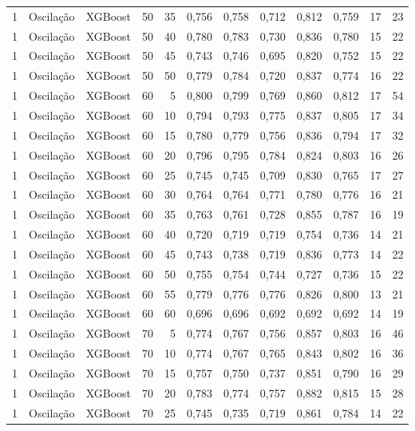\begin{longtable}{@{}rllrrrrrrrrr@{}}
1 & Oscilação & XGBoost & 50 & 35 & 0,756 & 0,758 & 0,712 & 0,812 & 0,759 & 17 & 23 \\
1 & Oscilação & XGBoost & 50 & 40 & 0,780 & 0,783 & 0,730 & 0,836 & 0,780 & 15 & 22 \\
1 & Oscilação & XGBoost & 50 & 45 & 0,743 & 0,746 & 0,695 & 0,820 & 0,752 & 15 & 22 \\
1 & Oscilação & XGBoost & 50 & 50 & 0,779 & 0,784 & 0,720 & 0,837 & 0,774 & 16 & 22 \\
1 & Oscilação & XGBoost & 60 & 5 & 0,800 & 0,799 & 0,769 & 0,860 & 0,812 & 17 & 54 \\
1 & Oscilação & XGBoost & 60 & 10 & 0,794 & 0,793 & 0,775 & 0,837 & 0,805 & 17 & 34 \\
1 & Oscilação & XGBoost & 60 & 15 & 0,780 & 0,779 & 0,756 & 0,836 & 0,794 & 17 & 32 \\
1 & Oscilação & XGBoost & 60 & 20 & 0,796 & 0,795 & 0,784 & 0,824 & 0,803 & 16 & 26 \\
1 & Oscilação & XGBoost & 60 & 25 & 0,745 & 0,745 & 0,709 & 0,830 & 0,765 & 17 & 27 \\
1 & Oscilação & XGBoost & 60 & 30 & 0,764 & 0,764 & 0,771 & 0,780 & 0,776 & 16 & 21 \\
1 & Oscilação & XGBoost & 60 & 35 & 0,763 & 0,761 & 0,728 & 0,855 & 0,787 & 16 & 19 \\
1 & Oscilação & XGBoost & 60 & 40 & 0,720 & 0,719 & 0,719 & 0,754 & 0,736 & 14 & 21 \\
1 & Oscilação & XGBoost & 60 & 45 & 0,743 & 0,738 & 0,719 & 0,836 & 0,773 & 14 & 22 \\
1 & Oscilação & XGBoost & 60 & 50 & 0,755 & 0,754 & 0,744 & 0,727 & 0,736 & 15 & 22 \\
1 & Oscilação & XGBoost & 60 & 55 & 0,779 & 0,776 & 0,776 & 0,826 & 0,800 & 13 & 21 \\
1 & Oscilação & XGBoost & 60 & 60 & 0,696 & 0,696 & 0,692 & 0,692 & 0,692 & 14 & 19 \\
1 & Oscilação & XGBoost & 70 & 5 & 0,774 & 0,767 & 0,756 & 0,857 & 0,803 & 16 & 46 \\
1 & Oscilação & XGBoost & 70 & 10 & 0,774 & 0,767 & 0,765 & 0,843 & 0,802 & 16 & 36 \\
1 & Oscilação & XGBoost & 70 & 15 & 0,757 & 0,750 & 0,737 & 0,851 & 0,790 & 16 & 29 \\
1 & Oscilação & XGBoost & 70 & 20 & 0,783 & 0,774 & 0,757 & 0,882 & 0,815 & 15 & 28 \\
1 & Oscilação & XGBoost & 70 & 25 & 0,745 & 0,735 & 0,719 & 0,861 & 0,784 & 14 & 22 \\

\end{longtable}
